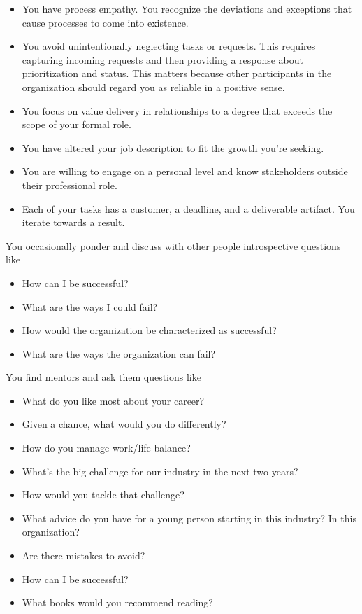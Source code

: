 \begin{itemize}
    \item You have \gls{process empathy}. You recognize the deviations and exceptions that cause processes to come into existence. 
    \item You avoid unintentionally neglecting tasks or requests. This requires capturing incoming requests and then providing a response about prioritization and status. This matters because other participants in the organization should regard you as reliable in a positive sense. 
    \item You focus on value delivery in relationships to a degree that exceeds the scope of your formal role.
\item You have altered your job description to fit the growth you're seeking.
\item You are willing to engage on a personal level and know stakeholders outside their professional role.
\item Each of your tasks has a customer, a deadline, and a deliverable artifact. You iterate towards a result. 
\end{itemize}

You occasionally ponder and discuss with other people introspective questions like
\begin{itemize}
    \item How can I be successful?
    \item What are the ways I could fail?
    \item How would the organization be characterized as successful?
    \item What are the ways the organization can fail?
\end{itemize}
You find mentors and ask them questions like
\begin{itemize}
    \item What do you like most about your career? 
    \item Given a chance, what would you do differently?
    \item How do you manage work/life balance?
    \item What's the big challenge for our industry in the next two years?
    \item How would you tackle that challenge?
    \item What advice do you have for a young person starting in this industry? In this organization? 
    \item Are there mistakes to avoid?  
    \item How can I be successful?
    \item What books would you recommend reading?
\end{itemize}

